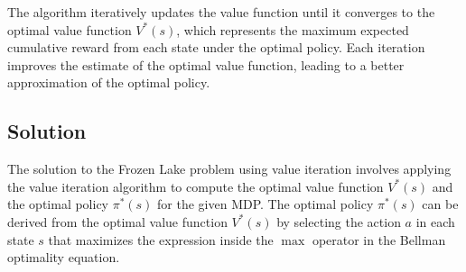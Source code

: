 \documentclass{article}
\begin{document}
The algorithm iteratively updates the value function until it converges to the optimal value function $V^*(s)$, which represents the maximum expected cumulative reward from each state under the optimal policy. Each iteration improves the estimate of the optimal value function, leading to a better approximation of the optimal policy.

\subsection*{Solution}

The solution to the Frozen Lake problem using value iteration involves applying the value iteration algorithm to compute the optimal value function $V^*(s)$ and the optimal policy $\pi^*(s)$ for the given MDP. The optimal policy $\pi^*(s)$ can be derived from the optimal value function $V^*(s)$ by selecting the action $a$ in each state $s$ that maximizes the expression inside the $\max$ operator in the Bellman optimality equation.
\end{document}
